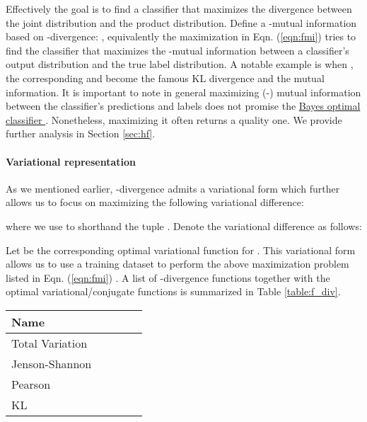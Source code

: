 \documentclass{article}
\begin{document}
Effectively the goal is to find a classifier that maximizes the divergence between the joint distribution and the product distribution. Define a -mutual information based on -divergence:
\underline{}
, equivalently the maximization in Eqn. (\ref{eqn:fmi}) tries to find the classifier that maximizes the -mutual information between a classifier's output distribution and the true label distribution. 
A notable example is when , the corresponding  and  become the famous KL divergence and the mutual information. It is important to note in general maximizing (-) mutual information between the classifier's predictions and labels does not promise the \underline{Bayes optimal classifier }. Nonetheless, maximizing it often returns a quality one. We provide further analysis in Section \ref{sec:hf}.

\paragraph{Variational representation} As we mentioned earlier, -divergence admits a variational form which further allows us to focus on maximizing the following variational difference:

where we use  to shorthand the tuple . Denote the variational difference as follows:

Let  be the corresponding optimal variational function  for .
This variational form allows us to use a training dataset  to perform the above maximization problem listed in Eqn. (\ref{eqn:fmi}) \citep{nowozin2016f}. A list of -divergence functions together with the optimal variational/conjugate functions  is summarized in Table \ref{table:f_div}.

\begin{table*}[!ht]
\tiny
\begin{center}
\begin{tabular}{ l l l l l} 
 \hline
 Name &   &  &  &  \\ 
 \hline
 Total Variation &  &   &  & \\
 Jenson-Shannon &  &  &   & \\
 Pearson   &  &  &  &  \\
 KL  &   & & & \\
\hline
\end{tabular}
\end{center}
\caption{s, optimal variational  (), conjugate functions (). A more complete table, including Jeffrey, Squared Hellinger, Neyman , Reverse KL, is provided in the Appendix.}
\label{table:f_div}
\end{table*}
\end{document}

